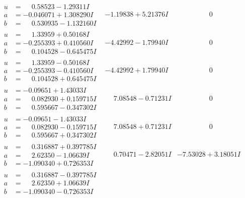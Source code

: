 \documentclass[1p]{elsarticle_modified}
\theoremstyle{definition}
\begin{document}
$$\begin{array}{c|c|c}
\begin{aligned}
u &= \phantom{-}0.58523 - 1.29311 I \\
a &= -0.046071 + 1.308290 I \\
b &= \phantom{-}0.530935 - 1.132160 I\end{aligned}
 & -1.19838 + 5.21376 I & \phantom{-0.000000 } 0 \\ \hline\begin{aligned}
u &= \phantom{-}1.33959 + 0.50168 I \\
a &= -0.255393 + 0.410560 I \\
b &= \phantom{-}0.104528 - 0.645475 I\end{aligned}
 & -4.42992 - 1.79940 I & \phantom{-0.000000 } 0 \\ \hline\begin{aligned}
u &= \phantom{-}1.33959 - 0.50168 I \\
a &= -0.255393 - 0.410560 I \\
b &= \phantom{-}0.104528 + 0.645475 I\end{aligned}
 & -4.42992 + 1.79940 I & \phantom{-0.000000 } 0 \\ \hline\begin{aligned}
u &= -0.09651 + 1.43033 I \\
a &= \phantom{-}0.082930 + 0.159715 I \\
b &= \phantom{-}0.595667 - 0.347302 I\end{aligned}
 & \phantom{-}7.08548 - 0.71231 I & \phantom{-0.000000 } 0 \\ \hline\begin{aligned}
u &= -0.09651 - 1.43033 I \\
a &= \phantom{-}0.082930 - 0.159715 I \\
b &= \phantom{-}0.595667 + 0.347302 I\end{aligned}
 & \phantom{-}7.08548 + 0.71231 I & \phantom{-0.000000 } 0 \\ \hline\begin{aligned}
u &= \phantom{-}0.316887 + 0.397785 I \\
a &= \phantom{-}2.62350 - 1.06639 I \\
b &= -1.090340 + 0.726353 I\end{aligned}
 & \phantom{-}0.70471 - 2.82051 I & -7.53028 + 3.18051 I \\ \hline\begin{aligned}
u &= \phantom{-}0.316887 - 0.397785 I \\
a &= \phantom{-}2.62350 + 1.06639 I \\
b &= -1.090340 - 0.726353 I\end{aligned}

\end{array}$$
\end{document}
